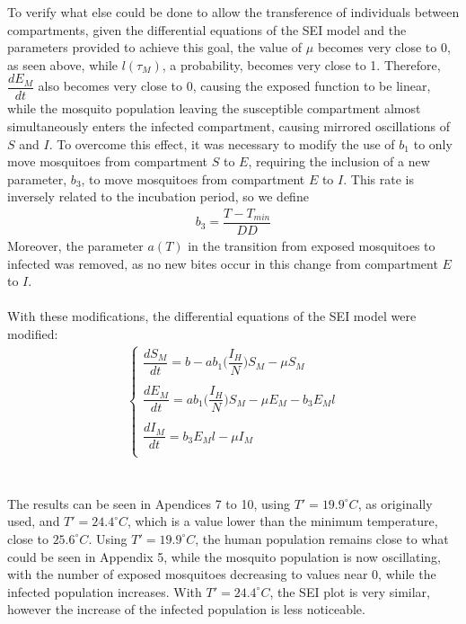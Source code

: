 To verify what else could be done to allow the 
transference of individuals between compartments,
given the differential equations of the SEI model and the 
parameters provided to achieve this goal, the value of $\mu$ becomes 
very close to 0, as seen above, while $l(\tau_M)$, a probability, becomes very 
close to 1. Therefore, $\dfrac{dE_M}{dt}$ also becomes very close to 0, 
causing the exposed function to be linear, while the mosquito population 
leaving the susceptible compartment almost simultaneously enters 
the infected compartment, causing mirrored oscillations of $S$ and $I$. 
To overcome this effect, it was necessary to modify the use of $b_1$ to 
only move mosquitoes from compartment $S$ to $E$, requiring the inclusion 
of a new parameter, $b_3$, to move mosquitoes from compartment $E$ to $I$. 
This rate is inversely related to the incubation period, so we define
\begin{gather*}
b_3 = \dfrac{T-T_{min}}{DD}
\end{gather*}
Moreover, the parameter $a(T)$ in the transition from 
exposed mosquitoes to infected was removed, as no new bites occur 
in this change from compartment $E$ to $I$.
\\\\
With these modifications, the differential equations of the SEI model were modified:
\begin{gather*}
\begin{cases}
\dfrac{dS_M}{dt} = b - ab_1\bigg(\dfrac{I_H}{N}\bigg)S_M - \mu S_M\\
\\
\dfrac{dE_M}{dt} = ab_1\bigg(\dfrac{I_H}{N}\bigg)S_M - \mu E_M - b_3E_Ml\\
\\
\dfrac{dI_M}{dt} = b_3E_Ml -\mu I_M\\
\end{cases}
\end{gather*}
\\\\
The results can be seen in Apendices 7 to 10, using $T'=19.9^\circ C$, as originally used,
and $T'=24.4^\circ C$, which is a value lower than the minimum temperature, close to $25.6^\circ C$.
Using $T'=19.9^\circ C$, the human population remains close to what could be seen in Appendix 5,
while the mosquito population is now oscillating, with the number of exposed 
mosquitoes decreasing to values near 0, while the infected population increases.
With $T'=24.4^\circ C$, the SEI plot is very similar, however the increase 
of the infected population is less noticeable.

